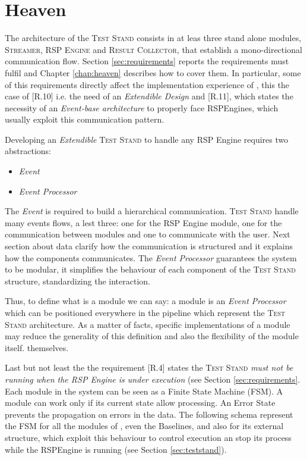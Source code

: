 
\section{Heaven}

The architecture of the \textsc{Test Stand} consists in at leas three stand alone modules, \textsc{Streamer}, \textsc{RSP Engine} and \textsc{Result Collector}, that establish a mono-directional communication flow. 
Section \ref{sec:requirements} reports the requirements \name must fulfil and Chapter \ref{chap:heaven} describes how to cover them. In particular, some of this requirements directly affect the implementation experience of \namens , this the case of [R.10] i.e. the need of an \textit{Extendible Design} and [R.11], which states the necessity of an \textit{Event-base architecture} to properly face RSPEngines, which usually exploit this communication pattern.

Developing an \textit{Extendible} \textsc{Test Stand} to handle any RSP Engine requires two abstractions:
\begin{itemize}
\item \textit{Event}
\item \textit{Event Processor}
\end{itemize} 

The \textit{Event} is required to build a hierarchical communication. \textsc{Test Stand} handle many events flows, a lest three: one for the RSP Engine module, one for the communication between modules and one to communicate with the user. Next section about data clarify how the communication is structured and it explains how the components communicates. The \textit{Event Processor} guarantees the system to be modular, it simplifies the behaviour of each component of the \textsc{Test Stand} structure, standardizing the interaction. 

Thus, to define what is a module we can say: a module is an \textit{Event Processor} which can be positioned everywhere in the pipeline which represent the \textsc{Test Stand} architecture.  As a matter of facts, specific implementations of a module may reduce the generality of this definition and also the flexibility of the module itself. themselves.	

Last but not least the the requirement [R.4] states the \textsc{Test Stand}\textit{ must not be running when the RSP Engine is under execution} (see Section \ref{sec:requirements}. Each module in the system can be seen as a Finite State Machine (FSM). A module can work only if its current state allow processing. An Error State prevents the propagation on errors in the data. The following schema represent the FSM for all the modules of \name, even the Baselines, and also for its external structure, which exploit this behaviour to control execution an stop its process while the RSPEngine is running (see Section \ref{sec:teststand}).

